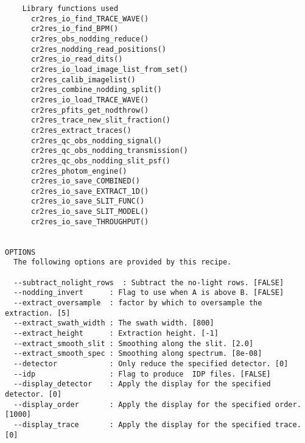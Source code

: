 \begin{verbatim}
    Library functions used                                                
      cr2res_io_find_TRACE_WAVE()                                         
      cr2res_io_find_BPM()                                                
      cr2res_obs_nodding_reduce()                                         
      cr2res_nodding_read_positions()                                     
      cr2res_io_read_dits()                                               
      cr2res_io_load_image_list_from_set()                                
      cr2res_calib_imagelist()                                            
      cr2res_combine_nodding_split()                                      
      cr2res_io_load_TRACE_WAVE()                                         
      cr2res_pfits_get_nodthrow()                                         
      cr2res_trace_new_slit_fraction()                                    
      cr2res_extract_traces()                                             
      cr2res_qc_obs_nodding_signal()                                      
      cr2res_qc_obs_nodding_transmission()                                
      cr2res_qc_obs_nodding_slit_psf()                                    
      cr2res_photom_engine()                                              
      cr2res_io_save_COMBINED()                                           
      cr2res_io_save_EXTRACT_1D()                                         
      cr2res_io_save_SLIT_FUNC()                                          
      cr2res_io_save_SLIT_MODEL()                                         
      cr2res_io_save_THROUGHPUT()                                         
  

OPTIONS
  The following options are provided by this recipe.

  --subtract_nolight_rows  : Subtract the no-light rows. [FALSE]
  --nodding_invert      : Flag to use when A is above B. [FALSE]
  --extract_oversample  : factor by which to oversample the extraction. [5]
  --extract_swath_width : The swath width. [800]
  --extract_height      : Extraction height. [-1]
  --extract_smooth_slit : Smoothing along the slit. [2.0]
  --extract_smooth_spec : Smoothing along spectrum. [8e-08]
  --detector            : Only reduce the specified detector. [0]
  --idp                 : Flag to produce  IDP files. [FALSE]
  --display_detector    : Apply the display for the specified detector. [0]
  --display_order       : Apply the display for the specified order. [1000]
  --display_trace       : Apply the display for the specified trace. [0]

\end{verbatim}
